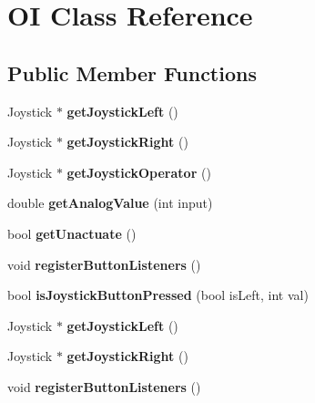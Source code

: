 \hypertarget{class_o_i}{}\section{O\+I Class Reference}
\label{class_o_i}
\subsection*{Public Member Functions}
\begin{DoxyCompactItemize}
\item 
\hypertarget{class_o_i_a44e3993b74e84ff3f42e085bf2339fd3}{}Joystick $\ast$ {\bfseries get\+Joystick\+Left} ()\label{class_o_i_a44e3993b74e84ff3f42e085bf2339fd3}

\item 
\hypertarget{class_o_i_a3e6f636adbcd28305a128c60ed37ca51}{}Joystick $\ast$ {\bfseries get\+Joystick\+Right} ()\label{class_o_i_a3e6f636adbcd28305a128c60ed37ca51}

\item 
\hypertarget{class_o_i_ab94df2d2b7daef071403aaa68f0c2110}{}Joystick $\ast$ {\bfseries get\+Joystick\+Operator} ()\label{class_o_i_ab94df2d2b7daef071403aaa68f0c2110}

\item 
\hypertarget{class_o_i_ab12f69fdde64ee428a470050108f7723}{}double {\bfseries get\+Analog\+Value} (int input)\label{class_o_i_ab12f69fdde64ee428a470050108f7723}

\item 
\hypertarget{class_o_i_a1235966866aa76065043d7f222ac5347}{}bool {\bfseries get\+Unactuate} ()\label{class_o_i_a1235966866aa76065043d7f222ac5347}

\item 
\hypertarget{class_o_i_a30153c1afd5cb73f706423af66587f01}{}void {\bfseries register\+Button\+Listeners} ()\label{class_o_i_a30153c1afd5cb73f706423af66587f01}

\item 
\hypertarget{class_o_i_aabe980a3191aaa7686ca122bb75fa64c}{}bool {\bfseries is\+Joystick\+Button\+Pressed} (bool is\+Left, int val)\label{class_o_i_aabe980a3191aaa7686ca122bb75fa64c}

\item 
\hypertarget{class_o_i_a9b2f26a2a2f61103a6542d147f23444e}{}Joystick $\ast$ {\bfseries get\+Joystick\+Left} ()\label{class_o_i_a9b2f26a2a2f61103a6542d147f23444e}

\item 
\hypertarget{class_o_i_a7fe906ee41761e1c317283c0078de84d}{}Joystick $\ast$ {\bfseries get\+Joystick\+Right} ()\label{class_o_i_a7fe906ee41761e1c317283c0078de84d}

\item 
\hypertarget{class_o_i_a30153c1afd5cb73f706423af66587f01}{}void {\bfseries register\+Button\+Listeners} ()\label{class_o_i_a30153c1afd5cb73f706423af66587f01}

\end{DoxyCompactItemize}
